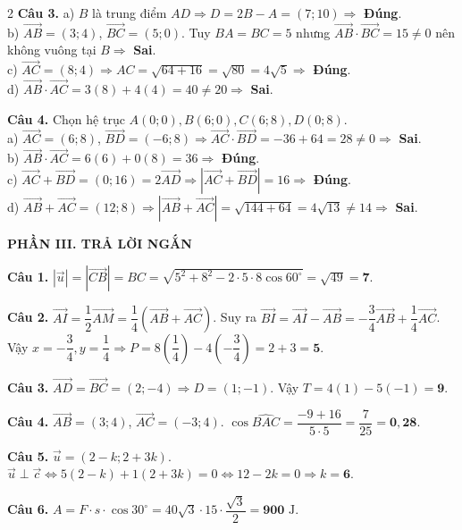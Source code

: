 \documentclass[10pt,a4paper]{article}
\begin{document}
\begin{multicols}{2}
\textbf{Câu 3.}
a) $B$ là trung điểm $AD \Rightarrow D = 2B - A = (7; 10) \Rightarrow$ \textbf{Đúng}.\\
b) $\vec{AB} = (3; 4)$, $\vec{BC} = (5; 0)$. Tuy $BA = BC = 5$ nhưng $\vec{AB} \cdot \vec{BC} = 15 \ne 0$ nên không vuông tại $B \Rightarrow$ \textbf{Sai}.\\
c) $\vec{AC} = (8; 4) \Rightarrow AC = \sqrt{64 + 16} = \sqrt{80} = 4\sqrt{5} \Rightarrow$ \textbf{Đúng}.\\
d) $\vec{AB} \cdot \vec{AC} = 3(8) + 4(4) = 40 \ne 20 \Rightarrow$ \textbf{Sai}.

\textbf{Câu 4.} Chọn hệ trục $A(0; 0), B(6; 0), C(6; 8), D(0; 8)$.\\
a) $\vec{AC} = (6; 8)$, $\vec{BD} = (-6; 8) \Rightarrow \vec{AC} \cdot \vec{BD} = -36 + 64 = 28 \ne 0 \Rightarrow$ \textbf{Sai}.\\
b) $\vec{AB} \cdot \vec{AC} = 6(6) + 0(8) = 36 \Rightarrow$ \textbf{Đúng}.\\
c) $\vec{AC} + \vec{BD} = (0; 16) = 2\vec{AD} \Rightarrow |\vec{AC} + \vec{BD}| = 16 \Rightarrow$ \textbf{Đúng}.\\
d) $\vec{AB} + \vec{AC} = (12; 8) \Rightarrow |\vec{AB} + \vec{AC}| = \sqrt{144 + 64} = 4\sqrt{13} \ne 14 \Rightarrow$ \textbf{Sai}.

\textbf{\color{accent}PHẦN III. TRẢ LỜI NGẮN}

\textbf{Câu 1.} $|\vec{u}| = |\vec{CB}| = BC = \sqrt{5^2 + 8^2 - 2\cdot 5\cdot 8\cos 60^\circ} = \sqrt{49} = \mathbf{7}$.

\textbf{Câu 2.} $\vec{AI} = \dfrac{1}{2}\vec{AM} = \dfrac{1}{4}(\vec{AB} + \vec{AC})$. Suy ra $\vec{BI} = \vec{AI} - \vec{AB} = -\dfrac{3}{4}\vec{AB} + \dfrac{1}{4}\vec{AC}$. Vậy $x = -\dfrac{3}{4}, y = \dfrac{1}{4} \Rightarrow P = 8\left(\dfrac{1}{4}\right) - 4\left(-\dfrac{3}{4}\right) = 2 + 3 = \mathbf{5}$.

\textbf{Câu 3.} $\vec{AD} = \vec{BC} = (2; -4) \Rightarrow D = (1; -1)$. Vậy $T = 4(1) - 5(-1) = \mathbf{9}$.

\textbf{Câu 4.} $\vec{AB} = (3; 4)$, $\vec{AC} = (-3; 4)$. $\cos\widehat{BAC} = \dfrac{-9 + 16}{5 \cdot 5} = \dfrac{7}{25} = \mathbf{0{,}28}$.

\textbf{Câu 5.} $\vec{u} = (2 - k; 2 + 3k)$. $\vec{u} \perp \vec{c} \Leftrightarrow 5(2 - k) + 1(2 + 3k) = 0 \Leftrightarrow 12 - 2k = 0 \Rightarrow k = \mathbf{6}$.

\textbf{Câu 6.} $A = F \cdot s \cdot \cos 30^\circ = 40\sqrt{3} \cdot 15 \cdot \dfrac{\sqrt{3}}{2} = \mathbf{900}\text{ J}$.


\end{multicols}
\end{document}
